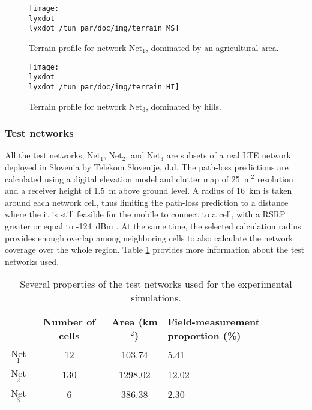\begin{figure*}
\begin{minipage}[t]{0.49\textwidth}%
\centering

\texttt{[image: \\lyxdot \\lyxdot /tun\_par/doc/img/terrain\_MS]}

\caption{Terrain profile for network Net$_{1}$, dominated by an agricultural
area.\label{fig:terrain_profile-Net1}}
%
\end{minipage}\hfill{}%
\begin{minipage}[t]{0.49\textwidth}%
\centering

\texttt{[image: \\lyxdot \\lyxdot /tun\_par/doc/img/terrain\_HI]}

\caption{Terrain profile for network Net$_{3}$, dominated by hills.\label{fig:terrain_profile-Net3}}
%
\end{minipage}
\end{figure*}



\subsubsection{Test networks \label{sub:Test-networks}}

All the test networks, Net$_{1}$, Net$_{2}$, and Net$_{3}$ are
subsets of a real LTE network deployed in Slovenia by Telekom Slovenije,
d.d. The path-loss predictions are calculated using a digital elevation
model and clutter map of 25~m$^{2}$ resolution and a receiver height
of 1.5~m above ground level. A radius of 16~km is taken around each
network cell, thus limiting the path-loss prediction to a distance
where the it is still feasible for the mobile to connect to a cell,
with a RSRP greater or equal to -124~dBm \cite{Neuland_Influence_of_Different_Factors_on_X_Map_Estimation_in_LTE:2011}.
At the same time, the selected calculation radius provides enough
overlap among neighboring cells to also calculate the network coverage
over the whole region. Table \ref{tab:Test_network_properties} provides
more information about the test networks used.

\begin{table}
\caption{Several properties of the test networks used for the experimental
simulations.\label{tab:Test_network_properties}}


{\footnotesize \centering}{\footnotesize \par}

{\footnotesize }%
\begin{tabular}{ccc>{\centering}p{2.5cm}}
\hline 
 & {\footnotesize Number of cells } & {\footnotesize Area (km$^{2}$)} & {\footnotesize Field-measurement proportion (\%)}\tabularnewline
\hline 
{\footnotesize Net$_{1}$ } & {\footnotesize 12} & {\footnotesize 103.74} & {\footnotesize 5.41}\tabularnewline
{\footnotesize Net$_{2}$ } & {\footnotesize 130 } & {\footnotesize 1298.02} & {\footnotesize 12.02}\tabularnewline
{\footnotesize Net$_{3}$ } & {\footnotesize 6 } & {\footnotesize 386.38} & {\footnotesize 2.30}\tabularnewline
\hline 
\end{tabular}
\end{table}


